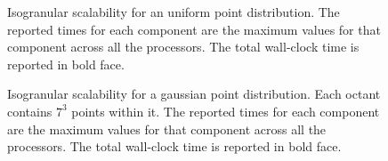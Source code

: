 
\begin{figure}
	\begin{center}
	
	\end{center}
\caption{\label{f:isoUniform} Isogranular scalability for an uniform point distribution. The reported times for 
each component are the maximum values for that component across all the processors. The total wall-clock
time is reported in bold face.} 
\end{figure}

\begin{figure}
	\begin{center}
	
	\end{center}
\caption{\label{f:isoGaussian} Isogranular scalability for a gaussian point distribution. Each octant contains $7^3$ points within it. 
The reported times for each component are the maximum values for that component across all the processors. The total wall-clock
time is reported in bold face.} 
\end{figure}
